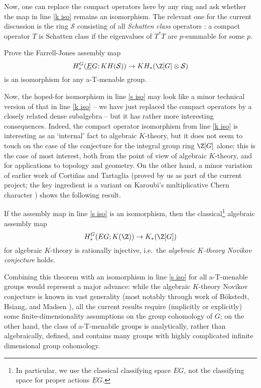 Now, one can replace the compact operators here by any ring and ask whether the map in line \eqref{k iso} remains an isomorphism.  The relevant one for the current discussion is the ring $\mathcal{S}$ consisting of all \emph{Schatten class} operators \cite[Chapter 2]{Simon:2005aa}: a compact operator $T$ is Schatten class if the eigenvalues of $T^*T$ are $p$-summable for some $p$.
 
 \begin{project}
 Prove the Farrell-Jones assembly map
 \begin{equation}\label{s iso}
 H^G_*(\underline{E}G;KH(\mathcal{S})) \to KH_*(\Z[G]\otimes \mathcal{S})
 \end{equation}
 is an isomorphism for any a-T-menable group.
 \end{project}
 
Now, the hoped-for isomorphism in line \eqref{s iso} may look like a minor technical version of that in line \eqref{k iso} -- we have just replaced the compact operators by a closely related dense subalgebra -- but it has rather more interesting consequences.  Indeed, the compact operator isomorphism from line \eqref{k iso} is interesting as an `internal' fact to algebraic $K$-theory, but it does not seem to touch on the case of the conjecture for the integral group ring $\Z[G]$ alone; this is the case of most interest, both from the point of view of algebraic $K$-theory, and for applications to topology and geometry.  On the other hand, a minor variation of earlier work of Corti\~{n}as and Tartaglia \cite{Cortinas:2013ly} (proved by us as part of the current project; the key ingredient is a variant on Karoubi's multiplicative Chern character \cite[Chapter 7]{Karoubi:1987zr}) shows the following result.

\begin{theorem}\label{reg the}
If the assembly map in line \eqref{s iso} is an isomorphism, then the classical\footnote{In particular, we use the classical classifying space $EG$, not the classifying space for proper actions $\underline{E}G$.} algebraic assembly map
$$
H^G_*(EG;K(\mathcal{\Z})) \to K_*(\Z[G])
$$
for algebraic $K$-theory is rationally injective, i.e.\ the \emph{algebraic $K$-theory Novikov conjecture} holds.
\end{theorem}

Combining this theorem with an isomorphism in line \eqref{s iso} for all a-T-menable groups would represent a major advance: while the algebraic $K$-theory Novikov conjecture is known in vast generality (most notably through work of B\"{o}kstedt, Hsiang, and Madsen \cite{Bokstedt:1993il}), all the current results require (implicitly or explicitly) some finite-dimensionality assumptions on the group cohomology of $G$; on the other hand, the class of a-T-menabile groups is analytically, rather than algebraically, defined, and contains many groups with highly complicated infinite dimensional group cohomology. 


